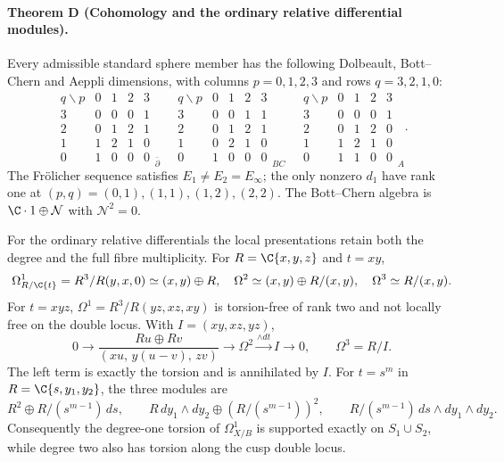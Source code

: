 \paragraph{Theorem D (Cohomology and the ordinary relative differential modules).}
\label{series:I:D}
Every admissible standard sphere member has the following
Dolbeault, Bott--Chern and Aeppli dimensions, with columns
$p=0,1,2,3$ and rows $q=3,2,1,0$:
\[
\begin{array}{c|rrrr}q\backslash p&0&1&2&3\\\hline
3&0&0&0&1\\2&0&1&2&1\\1&1&2&1&0\\0&1&0&0&0
\end{array}_{\bar\partial}\quad
\begin{array}{c|rrrr}q\backslash p&0&1&2&3\\\hline
3&0&0&1&1\\2&0&1&2&1\\1&0&2&1&0\\0&1&0&0&0
\end{array}_{BC}\quad
\begin{array}{c|rrrr}q\backslash p&0&1&2&3\\\hline
3&0&0&0&1\\2&0&1&2&0\\1&1&2&1&0\\0&1&1&0&0
\end{array}_{A}.
\]
The Fr\"olicher sequence satisfies $E_1\ne E_2=E_\infty$;
the only nonzero $d_1$ have rank one at
$(p,q)=(0,1),(1,1),(1,2),(2,2)$.  The Bott--Chern algebra is
$\C\cdot1\oplus\mathcal N$ with $\mathcal N^2=0$.

For the ordinary relative differentials the local presentations
retain both the degree and the full fibre multiplicity.  For
$R=\C\{x,y,z\}$ and $t=xy$,
\[
 \Omega^1_{R/\C\{t\}}=R^3/R(y,x,0)\simeq(x,y)\oplus R,
 \quad\Omega^2\simeq(x,y)\oplus R/(x,y),
 \quad\Omega^3\simeq R/(x,y).
\]
For $t=xyz$, $\Omega^1=R^3/R(yz,xz,xy)$ is torsion-free of
rank two and not locally free on the double locus.  With
$I=(xy,xz,yz)$,
\[
 0\longrightarrow
 \frac{Ru\oplus Rv}{(xu,\,y(u-v),\,zv)}
 \longrightarrow\Omega^2\xrightarrow{\wedge dt}I
 \longrightarrow0,
 \qquad \Omega^3=R/I.
\]
The left term is exactly the torsion and is annihilated by $I$.
For $t=s^m$ in $R=\C\{s,y_1,y_2\}$, the three modules are
\[
 R^2\oplus R/(s^{m-1})\,ds,\qquad
 R\,dy_1\wedge dy_2\oplus(R/(s^{m-1}))^2,
 \qquad R/(s^{m-1})\,ds\wedge dy_1\wedge dy_2.
\]
Consequently the degree-one torsion of $\Omega^1_{X/B}$ is
supported exactly on $S_1\cup S_2$, while degree two also has
torsion along the cusp double locus.

